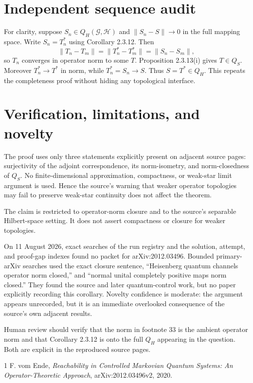 \documentclass[11pt]{article}
\newcommand{\QS}{Q_{\!S}}
\newcommand{\QH}{Q_{\!H}}
\begin{document}
\section{Independent sequence audit}

For clarity, suppose $S_n\in\QH(\mathcal G,\mathcal H)$ and
$\lVert S_n-S\rVert\to0$ in the full mapping space. Write $S_n=T_n^*$ using
Corollary 2.3.12. Then
\[
 \lVert T_n-T_m\rVert=\lVert T_n^*-T_m^*\rVert
 =\lVert S_n-S_m\rVert,
\]
so $T_n$ converges in operator norm to some $T$. Proposition 2.3.13(i) gives
$T\in\QS$. Moreover $T_n^*\to T^*$ in norm, while $T_n^*=S_n\to S$.
Thus $S=T^*\in\QH$. This repeats the completeness proof without hiding any
topological interface.

\section{Verification, limitations, and novelty}

The proof uses only three statements explicitly present on adjacent source
pages: surjectivity of the adjoint correspondence, its norm-isometry, and
norm-closedness of $\QS$. No finite-dimensional approximation, compactness,
or weak-star limit argument is used. Hence the source's warning that weaker
operator topologies may fail to preserve weak-star continuity does not affect
the theorem.

The claim is restricted to operator-norm closure and to the source's separable
Hilbert-space setting. It does not assert compactness or closure for weaker
topologies.

On 11 August 2026, exact searches of the run registry and the solution,
attempt, and proof-gap indexes found no packet for arXiv:2012.03496. Bounded
primary-arXiv searches used the exact closure sentence, ``Heisenberg quantum
channels operator norm closed,'' and ``normal unital completely positive maps
norm closed.'' They found the source and later quantum-control work, but no
paper explicitly recording this corollary. Novelty confidence is moderate:
the argument appears unrecorded, but it is an immediate overlooked consequence
of the source's own adjacent results.

Human review should verify that the norm in footnote 33 is the ambient
operator norm and that Corollary 2.3.12 is onto the full $\QH$ appearing in
the question. Both are explicit in the reproduced source pages.

\begin{thebibliography}{1}
F. vom Ende,
\emph{Reachability in Controlled Markovian Quantum Systems: An
Operator-Theoretic Approach}, arXiv:2012.03496v2, 2020.
\end{thebibliography}
\end{document}
